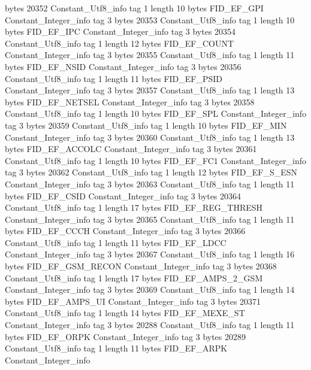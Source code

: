 {{{			bytes	20352
		}
		Constant_Utf8_info {
			tag	1
			length	10
			bytes	FID_EF_GPI
		}
		Constant_Integer_info {
			tag	3
			bytes	20353
		}
		Constant_Utf8_info {
			tag	1
			length	10
			bytes	FID_EF_IPC
		}
		Constant_Integer_info {
			tag	3
			bytes	20354
		}
		Constant_Utf8_info {
			tag	1
			length	12
			bytes	FID_EF_COUNT
		}
		Constant_Integer_info {
			tag	3
			bytes	20355
		}
		Constant_Utf8_info {
			tag	1
			length	11
			bytes	FID_EF_NSID
		}
		Constant_Integer_info {
			tag	3
			bytes	20356
		}
		Constant_Utf8_info {
			tag	1
			length	11
			bytes	FID_EF_PSID
		}
		Constant_Integer_info {
			tag	3
			bytes	20357
		}
		Constant_Utf8_info {
			tag	1
			length	13
			bytes	FID_EF_NETSEL
		}
		Constant_Integer_info {
			tag	3
			bytes	20358
		}
		Constant_Utf8_info {
			tag	1
			length	10
			bytes	FID_EF_SPL
		}
		Constant_Integer_info {
			tag	3
			bytes	20359
		}
		Constant_Utf8_info {
			tag	1
			length	10
			bytes	FID_EF_MIN
		}
		Constant_Integer_info {
			tag	3
			bytes	20360
		}
		Constant_Utf8_info {
			tag	1
			length	13
			bytes	FID_EF_ACCOLC
		}
		Constant_Integer_info {
			tag	3
			bytes	20361
		}
		Constant_Utf8_info {
			tag	1
			length	10
			bytes	FID_EF_FC1
		}
		Constant_Integer_info {
			tag	3
			bytes	20362
		}
		Constant_Utf8_info {
			tag	1
			length	12
			bytes	FID_EF_S_ESN
		}
		Constant_Integer_info {
			tag	3
			bytes	20363
		}
		Constant_Utf8_info {
			tag	1
			length	11
			bytes	FID_EF_CSID
		}
		Constant_Integer_info {
			tag	3
			bytes	20364
		}
		Constant_Utf8_info {
			tag	1
			length	17
			bytes	FID_EF_REG_THRESH
		}
		Constant_Integer_info {
			tag	3
			bytes	20365
		}
		Constant_Utf8_info {
			tag	1
			length	11
			bytes	FID_EF_CCCH
		}
		Constant_Integer_info {
			tag	3
			bytes	20366
		}
		Constant_Utf8_info {
			tag	1
			length	11
			bytes	FID_EF_LDCC
		}
		Constant_Integer_info {
			tag	3
			bytes	20367
		}
		Constant_Utf8_info {
			tag	1
			length	16
			bytes	FID_EF_GSM_RECON
		}
		Constant_Integer_info {
			tag	3
			bytes	20368
		}
		Constant_Utf8_info {
			tag	1
			length	17
			bytes	FID_EF_AMPS_2_GSM
		}
		Constant_Integer_info {
			tag	3
			bytes	20369
		}
		Constant_Utf8_info {
			tag	1
			length	14
			bytes	FID_EF_AMPS_UI
		}
		Constant_Integer_info {
			tag	3
			bytes	20371
		}
		Constant_Utf8_info {
			tag	1
			length	14
			bytes	FID_EF_MEXE_ST
		}
		Constant_Integer_info {
			tag	3
			bytes	20288
		}
		Constant_Utf8_info {
			tag	1
			length	11
			bytes	FID_EF_ORPK
		}
		Constant_Integer_info {
			tag	3
			bytes	20289
		}
		Constant_Utf8_info {
			tag	1
			length	11
			bytes	FID_EF_ARPK
		}
		Constant_Integer_info {
}}}

